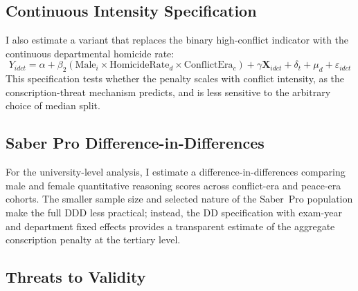 \documentclass[12pt]{article}
\begin{document}
\subsection{Continuous Intensity Specification}

I also estimate a variant that replaces the binary high-conflict indicator with the continuous departmental homicide rate:
\begin{equation}
Y_{idct} = \alpha + \beta_2 (\text{Male}_i \times \text{HomicideRate}_d \times \text{ConflictEra}_c) + \gamma \mathbf{X}_{idct} + \delta_t + \mu_d + \varepsilon_{idct}
\label{eq:continuous}
\end{equation}
This specification tests whether the penalty scales with conflict intensity, as the conscription-threat mechanism predicts, and is less sensitive to the arbitrary choice of median split.

\subsection{Saber Pro Difference-in-Differences}

For the university-level analysis, I estimate a difference-in-differences comparing male and female quantitative reasoning scores across conflict-era and peace-era cohorts. The smaller sample size and selected nature of the Saber~Pro population make the full DDD less practical; instead, the DD specification with exam-year and department fixed effects provides a transparent estimate of the aggregate conscription penalty at the tertiary level.

\subsection{Threats to Validity}
\end{document}
